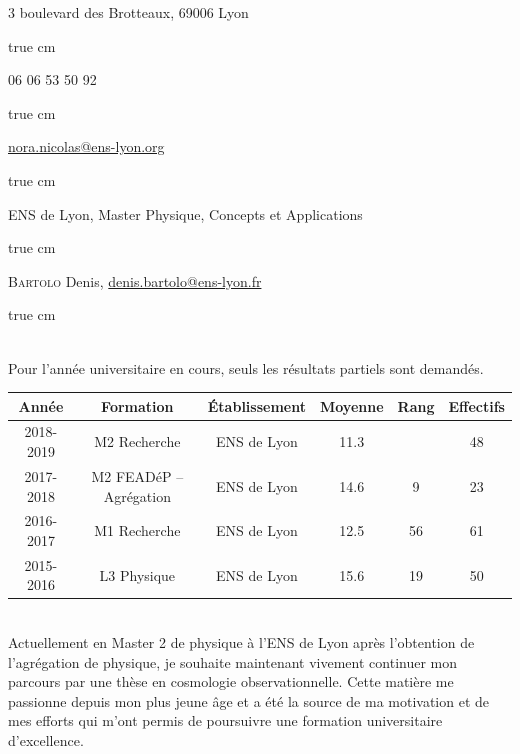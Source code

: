 \documentclass[11pt,a4]{article}
\begin{document}

3 boulevard des Brotteaux, 69006 Lyon

 true cm

06 06 53 50 92

 true cm

\href{mailto:nora.nicolas@ens-lyon.org}{nora.nicolas@ens-lyon.org}

 true cm

ENS de Lyon, Master Physique, Concepts et Applications

 true cm

\textsc{Bartolo} Denis, \href{mailto:denis.bartolo@ens-lyon.fr}{denis.bartolo@ens-lyon.fr}

 true cm

 \\ Pour l'année universitaire en cours, seuls les résultats
partiels sont demandés.

\begin{center}
    \begin{tabular}{|c|c|c|c|c|c|} \cline{1-6}
        Année     & Formation               & Établissement & Moyenne & Rang & Effectifs \\ \hline
        2018-2019 & M2 Recherche            & ENS de Lyon   & 11.3    &      & 48 \\ \hline
        2017-2018 & M2 FEADéP -- Agrégation & ENS de Lyon   & 14.6    & 9    & 23 \\ \hline
        2016-2017 & M1 Recherche            & ENS de Lyon   & 12.5    & 56   & 61 \\ \hline
        2015-2016 & L3 Physique             & ENS de Lyon   & 15.6    & 19   & 50 \\ \hline
    \end{tabular}
\end{center}

\newpage
{}\\

Actuellement en Master 2 de physique à l'ENS de Lyon après l'obtention de l'agrégation de physique,
je souhaite maintenant vivement continuer mon parcours par une thèse en cosmologie observationnelle.
Cette matière me passionne depuis mon plus jeune âge et a été la source de ma motivation et de mes
efforts qui m'ont permis de poursuivre une formation universitaire d'excellence. 
\end{document}
